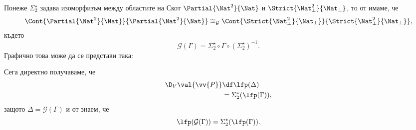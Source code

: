 \begin{example}
Понеже $\Sigma^\star_2$ задава изоморфизъм между областите на Скот $\Partial{\Nat^2}{\Nat}$ и $\Strict{\Nat^2_\bot}{\Nat_\bot}$,
то от  имаме, че
\[\Cont{\Partial{\Nat^2}{\Nat}}{\Partial{\Nat^2}{\Nat}} \cong_{\mathcal{G}} \Cont{\Strict{\Nat^2_\bot}{\Nat_\bot}}{\Strict{\Nat^2_\bot}{\Nat_\bot}},\]
където
\[\mathcal{G}(\Gamma) = \Sigma^\star_2 \circ \Gamma \circ (\Sigma^\star_2)^{-1}.\]
Графично това може да се представи така:
%
\begin{center}
\end{center}
%
Сега директно получаваме, че
\begin{align*}
  \D_V\val{\vv{P}} & \df \lfp(\Delta)\\
                   & = \Sigma^\star_2(\lfp(\Gamma)),
\end{align*}
защото $\Delta = \mathcal{G}(\Gamma)$ и от  знаем, че
\[\lfp(\mathcal{G}(\Gamma)) = \Sigma^\star_2(\lfp(\Gamma)).\]
\end{example}

